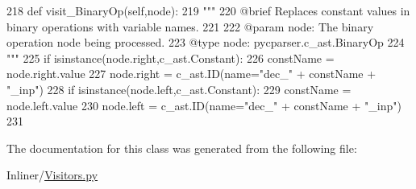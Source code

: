 \begin{DoxyCode}
218     \textcolor{keyword}{def }visit\_BinaryOp(self,node):
219         \textcolor{stringliteral}{"""
}
220 \textcolor{stringliteral}{        @brief Replaces constant values in binary operations with variable names.
}
221 \textcolor{stringliteral}{
}
222 \textcolor{stringliteral}{        @param node: The binary operation node being processed.
}
223 \textcolor{stringliteral}{        @type node: pycparser.c\_ast.BinaryOp
}
224 \textcolor{stringliteral}{        """}
225         \textcolor{keywordflow}{if} isinstance(node.right,c\_ast.Constant):
226             constName = node.right.value
227             node.right = c\_ast.ID(name=\textcolor{stringliteral}{"dec\_"} + constName + \textcolor{stringliteral}{"\_inp"})
228         \textcolor{keywordflow}{if} isinstance(node.left,c\_ast.Constant):
229             constName = node.left.value
230             node.left = c\_ast.ID(name=\textcolor{stringliteral}{"dec\_"} + constName + \textcolor{stringliteral}{"\_inp"})
231 
\end{DoxyCode}


The documentation for this class was generated from the following file\+:\begin{DoxyCompactItemize}
\item 
Inliner/\hyperlink{Visitors_8py}{Visitors.\+py}\end{DoxyCompactItemize}
